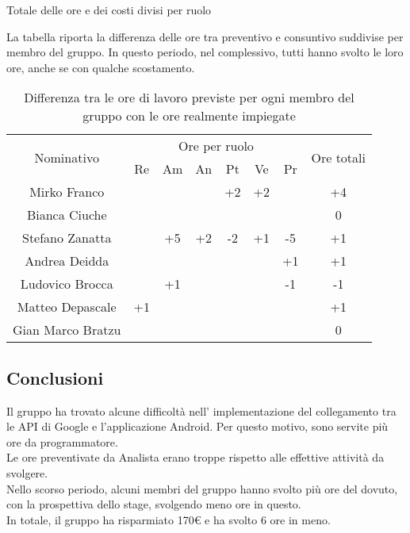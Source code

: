 \begin{flushleft}
\begin{table}[H]
\begin{center}
			\caption{Totale delle ore e dei costi divisi per ruolo} 
		\end{center}
	\end{table}

	La tabella riporta la differenza delle ore tra preventivo e consuntivo suddivise per membro del gruppo. In questo periodo, nel complessivo, tutti hanno svolto le loro ore, anche se con qualche scostamento. 
	
	\begin{table}[H]
		\begin{center}
			\begin{tabularx}{\textwidth}{|c|cccccc|c|}
				
				\hline
				\multirow{2}{*}{Nominativo} & \multicolumn{6}{c|}{Ore per ruolo} & \multirow{2}{*}{Ore totali} \\ \cline{2-7}
				& Re & Am & An & Pt & Ve & Pr &      \\ \hline
				\endhead
				Mirko Franco       &   &  &   & +2& +2 &   & +4        \\ \hline
				Bianca Ciuche      &   &  &   &   &    &   & 0        \\ \hline
				Stefano Zanatta    &   &+5& +2&	-2& +1 & -5& +1        \\ \hline
				Andrea Deidda      &   &  &   &   &    & +1& +1  		\\ \hline
				Ludovico Brocca    &   &+1&   &   &    & -1& -1        \\ \hline
				Matteo Depascale   & +1&  &   &   &    &   & +1  		\\ \hline
				Gian Marco Bratzu  &   &  &   &   &    &   & 0        \\ \hline
				
			\end{tabularx}
			\caption{Differenza tra le ore di lavoro previste per ogni membro del gruppo con le ore realmente impiegate }
		\end{center}
	\end{table}

	\subsection{Conclusioni}
	Il gruppo ha trovato alcune difficoltà nell' implementazione del collegamento tra le API di Google e l'applicazione Android. Per questo motivo, sono servite più ore da programmatore.\\Le ore preventivate da Analista erano troppe rispetto alle effettive attività da svolgere.\\
	Nello scorso periodo, alcuni membri del gruppo hanno svolto più ore del dovuto, con la prospettiva dello stage, svolgendo meno ore in questo.\\
	In totale, il gruppo ha risparmiato 170{\euro} e ha svolto 6 ore in meno.


\end{flushleft}
